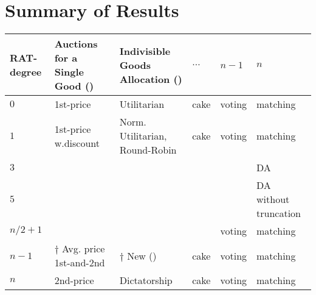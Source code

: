 \newpage
\section{Summary of Results}

\renewcommand{\arraystretch}{1.1}



\begin{tabular}{|K{1cm}|K{2cm}|K{2cm}|K{2cm}|K{2cm}|K{2cm}|}
\hline
RAT-degree  &  Auctions for a Single Good () & Indivisible Goods Allocation () & $\ldots$ &$n-1$ & $n$ \\
\hline
\hline
$0$ & 1st-price & 
Utilitarian & cake & voting & matching\\
\hline
$1$ & 1st-price w.discount & Norm. Utilitarian, Round-Robin & cake & voting & matching\\
\hline
$3$ &  &  &  &  & DA \\
\hline
$5$ &  & & &  & DA without truncation\\
\hline
$n/2+1$ &  &  &  & voting & matching\\
\hline
$n-1$ & $\dagger$ Avg. price 1st-and-2nd  & $\dagger$ New  () & cake & voting & matching\\
\hline
$n$ & 2nd-price & Dictatorship & cake & voting & matching \\
\hline
\end{tabular}

